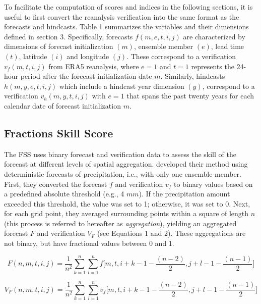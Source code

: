 \documentclass[preprint,12pt,authoryear]{elsarticle}
\begin{document}
To facilitate the computation of scores and indices in the following sections, it is useful to first convert the reanalysis verification into the same format as the forecasts and hindcasts. Table 1 summarizes the variables and their dimensions defined in section 3. Specifically, forecasts $f(m,e,t,i,j)$ are characterized by dimensions of forecast initialization $(m)$, ensemble member $(e)$, lead time $(t)$, latitude $(i)$ and longitude $(j)$. These correspond to a verification $v_{f}(m,t,i,j)$ from ERA5 reanalysis, where $e=1$ and $t=1$ represents the 24-hour period after the forecast initialization date $m$. Similarly, hindcasts $h(m,y,e,t,i,j)$ which include a hindcast year dimension $(y)$, correspond to a verification $v_{h}(m,y,t,i,j)$ with $e=1$ that spans the past twenty years for each calendar date of forecast initialization $m$.     




\subsection{Fractions Skill Score}

The FSS uses binary forecast and verification data to assess the skill of the forecast at different levels of spatial aggregation. \cite{RobertsLean2008} developed their method using deterministic forecasts of precipitation, i.e., with only one ensemble-member. First, they converted the forecast $f$ and verification $v_{f}$ to binary values based on a predefined absolute threshold (e.g., 4 $mm$). If the precipitation amount exceeded this threshold, the value was set to 1; otherwise, it was set to 0. Next, for each grid point, they averaged surrounding points within a square of length $n$ (this process is referred to hereafter as \textit{aggregation}), yielding an aggregated forecast $F$ and verification $V_{F}$ (see Equations 1 and 2). These aggregations are not binary, but have fractional values between 0 and 1.

\begin{equation}
    F(n,m,t,i,j) = \frac{1}{n^2} \sum_{k=1}^{n}\sum_{l=1}^{n} f\bigg[m, t, i + k - 1 - \frac{(n-2)}{2}, j + l -1 - \frac{(n-1)}{2}\bigg]
\end{equation}

\begin{equation}
    V_{F}(n,m,t,i,j) = \frac{1}{n^2} \sum_{k=1}^{n}\sum_{l=1}^{n} v_{f}\bigg[m, t, i + k - 1 - \frac{(n-2)}{2}, j + l -1 - \frac{(n-1)}{2}\bigg]
\end{equation}
\end{document}
